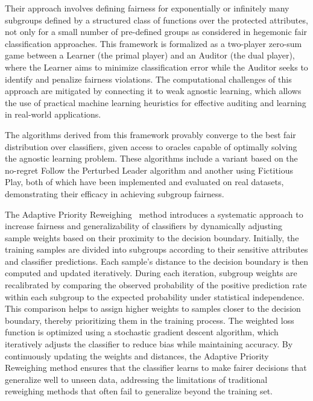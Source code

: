 Their approach involves defining fairness for exponentially or infinitely many subgroups defined by a structured class of functions over the protected attributes, not only for a small number of pre-defined groups as considered in hegemonic fair classification approaches. This framework is formalized as a two-player zero-sum game between a Learner (the primal player) and an Auditor (the dual player), where the Learner aims to minimize classification error while the Auditor seeks to identify and penalize fairness violations. The computational challenges of this approach are mitigated by connecting it to weak agnostic learning, which allows the use of practical machine learning heuristics for effective auditing and learning in real-world applications.

The algorithms derived from this framework provably converge to the best fair distribution over classifiers, given access to oracles capable of optimally solving the agnostic learning problem. These algorithms include a variant based on the no-regret Follow the Perturbed Leader algorithm and another using Fictitious Play, both of which have been implemented and evaluated on real datasets, demonstrating their efficacy in achieving subgroup fairness.


The Adaptive Priority Reweighing~\cite{HuXT23} method introduces a systematic approach to increase fairness and generalizability of classifiers by dynamically adjusting sample weights based on their proximity to the decision boundary. Initially, the training samples are divided into subgroups according to their sensitive attributes and classifier predictions. Each sample's distance to the decision boundary is then computed and updated iteratively. During each iteration, subgroup weights are recalibrated by comparing the observed probability of the positive prediction rate within each subgroup to the expected probability under statistical independence. This comparison helps to assign higher weights to samples closer to the decision boundary, thereby prioritizing them in the training process. The weighted loss function is optimized using a stochastic gradient descent algorithm, which iteratively adjusts the classifier to reduce bias while maintaining accuracy. By continuously updating the weights and distances, the Adaptive Priority Reweighing method ensures that the classifier learns to make fairer decisions that generalize well to unseen data, addressing the limitations of traditional reweighing methods that often fail to generalize beyond the training set.


